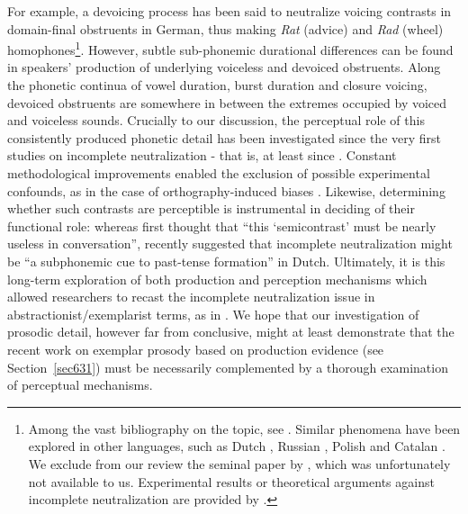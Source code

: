 For example, a devoicing process has been said to neutralize voicing contrasts in domain-final obstruents in German, thus making \textit{Rat} (advice) and \textit{Rad} (wheel) homophones\footnote{Among the vast bibliography on the topic, see \citet{port1981neutralization,odell1983discrimination,charlesluce1985word,port1985neutralization,port1989incomplete,port1996discreteness,kleber2010implications,rottger2011robustness,winterFORTHnature}. Similar phenomena have been explored in other languages, such as Dutch \citep{warner2004incomplete,warner2006orthographic,ernestus2006functionality}, Russian \citep{pye1986word,dmitrieva2010phonological}, Polish \citep{slowiaczek1985neutralizing,slowiaczek1989perception} and Catalan \citep{dinnsen1984phonological,charlesluce1987reanalysis}. We exclude from our review the seminal paper by \citet{dinnsen1971three}, which was unfortunately not available to us. Experimental results or theoretical arguments against incomplete neutralization are provided by \citet{fourakis1984incomplete,mascaro1987underlying,jassem1989neutralization,kopkalli1993phonetic,manaster1996letter}.}. However, subtle sub-phonemic durational differences can be found in speakers' production of underlying voiceless and devoiced obstruents. Along the phonetic continua of vowel duration, burst duration and closure voicing, devoiced obstruents are somewhere in between the extremes occupied by voiced and voiceless sounds. Crucially to our discussion, the perceptual role of this consistently produced phonetic detail has been investigated since the very first studies on incomplete neutralization - that is, at least since \citet{port1981neutralization}. Constant methodological improvements enabled the exclusion of possible experimental confounds, as in the case of orthography-induced biases \citep{rottger2011robustness}. Likewise, determining whether such contrasts are perceptible is instrumental in deciding of their functional role: whereas \citet{port1981neutralization} first thought that ``this `semicontrast' must be nearly useless in conversation'', \citet{ernestus2006functionality} recently suggested that incomplete neutralization might be ``a subphonemic cue to past-tense formation'' in Dutch. Ultimately, it is this long-term exploration of both production and perception mechanisms which allowed researchers to recast the incomplete neutralization issue in abstractionist/exemplarist terms, as in \citet{kleber2010implications}. We hope that our investigation of prosodic detail, however far from conclusive, might at least demonstrate that the recent work on exemplar prosody based on production evidence (see Section~\ref{sec631}) must be necessarily complemented by a thorough examination of perceptual mechanisms.

